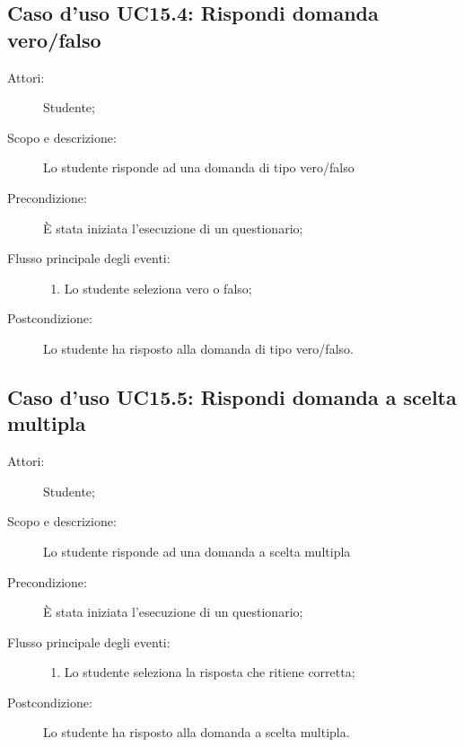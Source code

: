 \subsection{Caso d'uso UC15.4: Rispondi domanda vero/falso}\begin{description}
\item[Attori:] Studente;
\item[Scopo e descrizione:] Lo studente risponde ad una domanda di tipo vero/falso
      \item[Precondizione:] È stata iniziata l'esecuzione di un questionario;

        \item[Flusso principale degli eventi:] \begin{enumerate}
          \item Lo studente seleziona vero o falso;

      \end{enumerate}
    \item[Postcondizione:] Lo studente ha risposto alla domanda di tipo vero/falso.
  \end{description}
\hypertarget{UC15.5}{}
\subsection{Caso d'uso UC15.5: Rispondi domanda a scelta multipla}\begin{description}
\item[Attori:] Studente;
\item[Scopo e descrizione:] Lo studente risponde ad una domanda a scelta multipla
      \item[Precondizione:] È stata iniziata l'esecuzione di un questionario;

        \item[Flusso principale degli eventi:] \begin{enumerate}
          \item Lo studente seleziona la risposta che ritiene corretta;

      \end{enumerate}
    \item[Postcondizione:] Lo studente ha risposto alla domanda a scelta multipla.
  \end{description}
\hypertarget{UC15.6}{}
